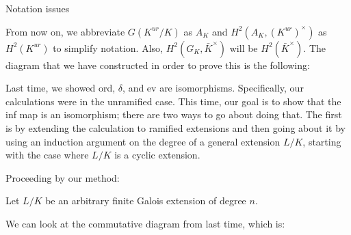\documentclass[class=article, crop=false]{standalone}
\begin{document}
\begin{center}
\end{center}

{\color{red} Notation issues}

From now on, we abbreviate $G(K^{ur}/K)$ as $A_K$ and $H^2(A_K, (K^{ur})^\times)$ as $H^2(K^{ur})$ to simplify notation. Also, $H^2(G_K, \bar{K}^\times)$ will be $H^2(\bar{K}^\times)$. 
The diagram that we have constructed in order to prove this is the following:


\begin{center}
\end{center}

Last time, we showed ord, $\delta$, and ev are isomorphisms. 
Specifically, our calculations were in the unramified case. 
This time, our goal is to show that the inf map is an isomorphism; there are two ways to go about doing that. 
The first is by extending the calculation to ramified extensions and then going about it by using an induction argument on the degree of a general extension $L/K$, starting with the case where $L/K$ is a cyclic extension. 


Proceeding by our method:

Let $L/K$ be an arbitrary finite Galois extension of degree $n$. 

We can look at the commutative diagram from last time, which is: 

\begin{center}
\end{center}
\end{document}
